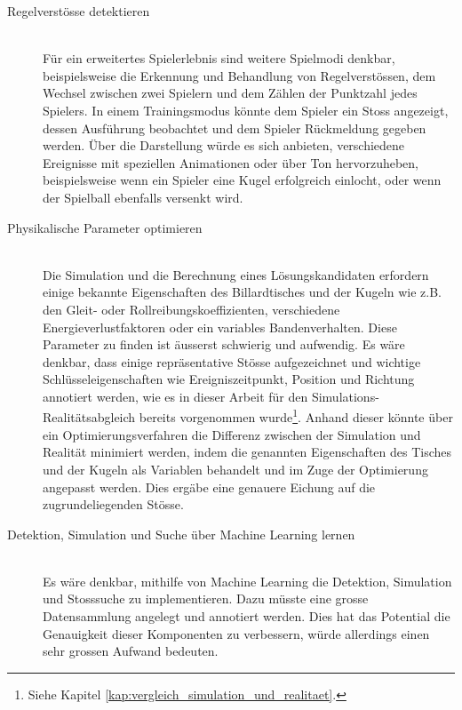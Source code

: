 \begin{description}
    \item[Regelverstösse detektieren]\mbox{} \\
    Für ein erweitertes Spielerlebnis sind weitere Spielmodi denkbar, beispielsweise die Erkennung und Behandlung von
    Regelverstössen, dem Wechsel zwischen zwei Spielern und dem Zählen der Punktzahl jedes Spielers.
    In einem Trainingsmodus könnte dem Spieler ein Stoss angezeigt, dessen Ausführung beobachtet und dem Spieler
    Rückmeldung gegeben werden.
    Über die Darstellung würde es sich anbieten, verschiedene Ereignisse mit speziellen Animationen oder über Ton hervorzuheben,
    beispielsweise wenn ein Spieler eine Kugel erfolgreich einlocht, oder wenn der Spielball ebenfalls versenkt wird.
    \item[Physikalische Parameter optimieren]\mbox{} \\
    Die Simulation und die Berechnung eines Lösungskandidaten erfordern einige bekannte Eigenschaften des Billardtisches und
    der Kugeln wie z.B. den Gleit- oder Rollreibungskoeffizienten, verschiedene Energieverlustfaktoren oder ein variables
    Bandenverhalten. Diese Parameter zu finden ist äusserst schwierig und aufwendig. Es wäre denkbar, dass einige repräsentative
    Stösse aufgezeichnet und wichtige Schlüsseleigenschaften wie Ereigniszeitpunkt, Position und Richtung annotiert werden,
    wie es in dieser Arbeit für den Simulations- Realitätsabgleich bereits vorgenommen
    wurde\footnote{Siehe Kapitel \ref{kap:vergleich_simulation_und_realitaet}.}. Anhand dieser könnte über ein Optimierungsverfahren
    die Differenz zwischen der Simulation und Realität minimiert werden, indem die genannten Eigenschaften des Tisches und
    der Kugeln als Variablen behandelt und im Zuge der Optimierung angepasst werden. Dies ergäbe eine genauere Eichung auf
    die zugrundeliegenden Stösse.
    \item[Detektion, Simulation und Suche über Machine Learning lernen]\mbox{} \\
    Es wäre denkbar, mithilfe von Machine Learning die Detektion, Simulation und Stosssuche zu implementieren.
    Dazu müsste eine grosse Datensammlung angelegt und annotiert werden.
    Dies hat das Potential die Genauigkeit dieser Komponenten zu verbessern, würde allerdings einen sehr grossen Aufwand bedeuten.
\end{description}
